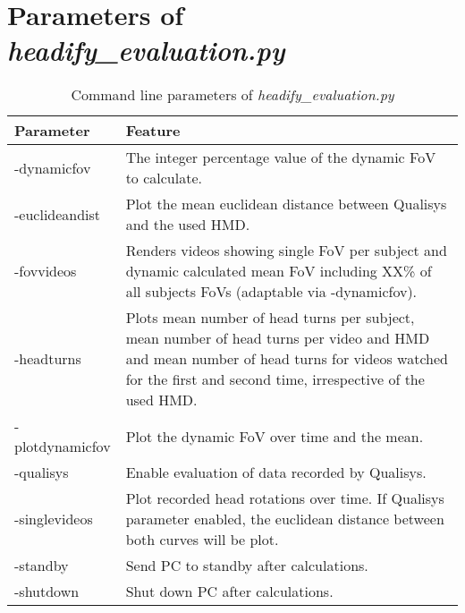 \section{Parameters of \textit{headify\_evaluation.py}} \label{appendix:headify_evaluation}

\begin{table}[!h]
	\centering
	\begin{tabular}{|>{\RaggedRight}p{3cm}|>{\RaggedRight}p{10cm}|}\hline
		\rowcolor[gray] {.6} \textbf{Parameter} & \textbf{Feature} \\ \hline
		-dynamicfov & The integer percentage value of the dynamic FoV to calculate. \\ \hline
		-euclideandist & Plot the mean euclidean distance between Qualisys and the used HMD. \\ \hline
		-fovvideos & Renders videos showing single FoV per subject and dynamic calculated mean FoV including XX\% of all subjects FoVs (adaptable via -dynamicfov). \\ \hline
		-headturns & Plots mean number of head turns per subject, mean number of head turns per video and HMD and mean number of head turns for videos watched for the first and second time, irrespective of the used HMD.  \\ \hline
		-plotdynamicfov & Plot the dynamic FoV over time and the mean. \\ \hline
		-qualisys & Enable evaluation of data recorded by Qualisys. \\ \hline
		-singlevideos & Plot recorded head rotations over time. If Qualisys parameter enabled, the euclidean distance between both curves will be plot. \\ \hline
		-standby & Send PC to standby after calculations. \\ \hline
		-shutdown & Shut down PC after calculations. \\ \hline
	\end{tabular}
	\caption{Command line parameters of \textit{headify\_evaluation.py}}
	\label{table:commands_headify_evaluation}
\end{table}
